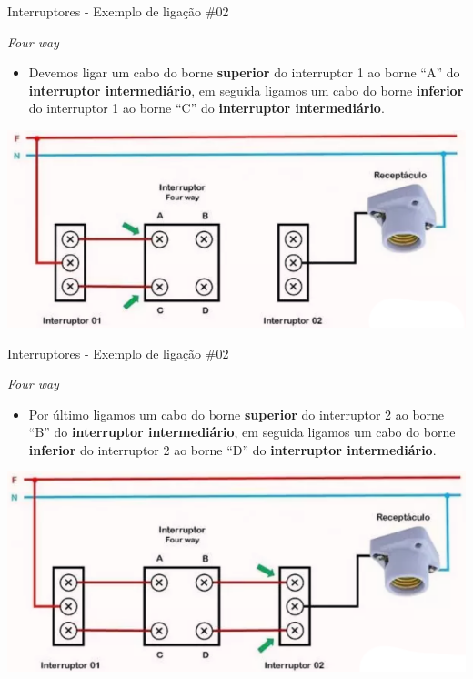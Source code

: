 \begin{frame}{Interruptores - Exemplo de ligação \#02}
	\begin{block}{\textit{Four way}}
		\begin{itemize}
			\item Devemos ligar um cabo do borne \textbf{superior} do interruptor 1 ao borne “A” do \textbf{interruptor intermediário}, em seguida ligamos um cabo do borne \textbf{inferior} do interruptor 1 ao borne “C” do \textbf{interruptor intermediário}.
		\end{itemize}
	\end{block}

	\bigskip

	\centering
	\includegraphics[width=0.8\linewidth]{Figuras/Ch08/fig24}
\end{frame}


\begin{frame}{Interruptores - Exemplo de ligação \#02}
	\begin{block}{\textit{Four way}}
		\begin{itemize}
			\item Por último ligamos um cabo do borne \textbf{superior} do interruptor 2 ao borne “B” do \textbf{interruptor intermediário}, em seguida ligamos um cabo do borne \textbf{inferior} do interruptor 2 ao borne “D” do \textbf{interruptor intermediário}.
		\end{itemize}
	\end{block}

	\bigskip

	\centering
	\includegraphics[width=0.8\linewidth]{Figuras/Ch08/fig25}
\end{frame}



